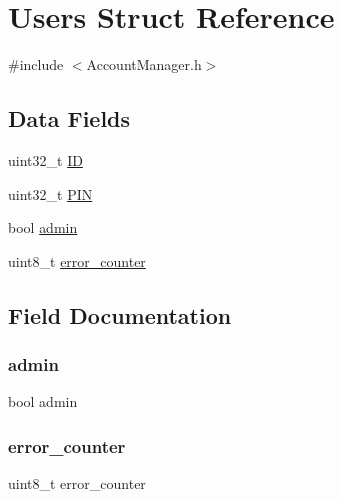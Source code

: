 \hypertarget{struct_users}{}\section{Users Struct Reference}
\label{struct_users}


{\ttfamily \#include $<$Account\+Manager.\+h$>$}

\subsection*{Data Fields}
\begin{DoxyCompactItemize}
\item 
uint32\+\_\+t \mbox{\hyperlink{struct_users_a505f98fde467109a9b37b3c7e008df91}{ID}}
\item 
uint32\+\_\+t \mbox{\hyperlink{struct_users_a91ee63dd24a702a6b71474783c75a66c}{P\+IN}}
\item 
bool \mbox{\hyperlink{struct_users_a2b91ea0bc21540d131b22cfdfe731575}{admin}}
\item 
uint8\+\_\+t \mbox{\hyperlink{struct_users_ac600fd46d2914d09fe3d45b3a2c7ac1f}{error\+\_\+counter}}
\end{DoxyCompactItemize}


\subsection{Field Documentation}
\mbox{\label{struct_users_a2b91ea0bc21540d131b22cfdfe731575}} 
\subsubsection{\texorpdfstring{admin}{admin}}
{\footnotesize\ttfamily bool admin}

\mbox{\label{struct_users_ac600fd46d2914d09fe3d45b3a2c7ac1f}} 
\subsubsection{\texorpdfstring{error\+\_\+counter}{error\_counter}}
{\footnotesize\ttfamily uint8\+\_\+t error\+\_\+counter}

\mbox{\label{struct_users_a505f98fde467109a9b37b3c7e008df91}} 
